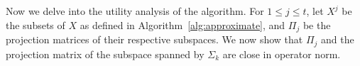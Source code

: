 \begin{comment}
Now we delve into the utility analysis of the algorithm.
Note that any matrix can be represented by its singular
value decomposition (SVD), that is, any matrix $A=UDV^T$,
where $D$ is a diagonal matrix containing its singular
values in decreasing order, $U$ is the matrix with left
singular vectors, and $V$ is the matrix with right singular
vectors, and $XX^T$ is a symmetric matrix $UDD^TU^T$,
where $U$ is the matrix containing the eigenvectors of
$XX^T$. Hence, to work with the projection matrix of
the subspace spanned by the columns of $X$, we can directly
work with the subspace spanned by the columns vectors
of $XX^T$ because they are equivalent. For $1 \leq j \leq t$,
let $X^j$ be the subsets of $X$ as defined in
Algorithm~\ref{alg:approximate}, and $\Pi_j$ be the
projection matrices of their respective subspaces. We
now show that $\Pi_j$ and the projection matrix of the
subspace spanned by $\Sigma_k$ are close in operator norm.

\end{comment}

Now we delve into the utility analysis of the algorithm.
For $1 \leq j \leq t$,
let $X^j$ be the subsets of $X$ as defined in
Algorithm~\ref{alg:approximate}, and $\Pi_j$ be the
projection matrices of their respective subspaces. We
now show that $\Pi_j$ and the projection matrix of the
subspace spanned by $\Sigma_k$ are close in operator norm.

